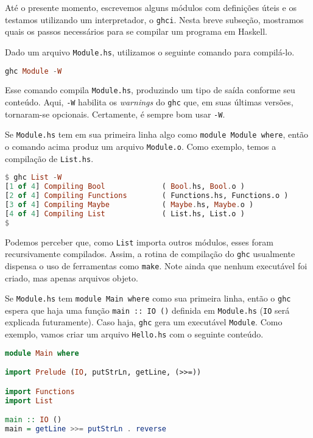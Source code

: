 \documentclass[a4paper]{article}
\begin{document}
Até o presente momento, escrevemos alguns módulos com definições úteis e os testamos utilizando um interpretador, o \texttt{ghci}.
Nesta breve subseção, mostramos quais os passos necessários para se compilar um programa em Haskell.

Dado um arquivo \texttt{Module.hs}, utilizamos o seguinte comando para compilá-lo.

\begin{lstlisting}[language=haskell, frame=single]
ghc Module -W
\end{lstlisting}

Esse comando compila \texttt{Module.hs}, produzindo um tipo de saída conforme seu conteúdo.
Aqui, \texttt{-W} habilita os \emph{warnings} do \texttt{ghc} que, em suas últimas versões, tornaram-se opcionais.
Certamente, é sempre bom usar \texttt{-W}.

Se \texttt{Module.hs} tem em sua primeira linha algo como \texttt{module Module where}, então o comando acima produz um arquivo \texttt{Module.o}.
Como exemplo, temos a compilação de \texttt{List.hs}.

\begin{lstlisting}[language=haskell, frame=single]
$ ghc List -W
[1 of 4] Compiling Bool             ( Bool.hs, Bool.o )
[2 of 4] Compiling Functions        ( Functions.hs, Functions.o )
[3 of 4] Compiling Maybe            ( Maybe.hs, Maybe.o )
[4 of 4] Compiling List             ( List.hs, List.o )
$
\end{lstlisting}

Podemos perceber que, como \texttt{List} importa outros módulos, esses foram recursivamente compilados.
Assim, a rotina de compilação do \texttt{ghc} usualmente dispensa o uso de ferramentas como \texttt{make}.
Note ainda que nenhum executável foi criado, mas apenas arquivos objeto.

Se \texttt{Module.hs} tem \texttt{module Main where} como sua primeira linha, então o \texttt{ghc} espera que haja uma função \texttt{main :: IO ()} definida em \texttt{Module.hs} (\texttt{IO} será explicada futuramente).
Caso haja, \texttt{ghc} gera um executável \texttt{Module}.
Como exemplo, vamos criar um arquivo \texttt{Hello.hs} com o seguinte conteúdo.

\begin{lstlisting}[language=haskell, frame=single]
module Main where

import Prelude (IO, putStrLn, getLine, (>>=))

import Functions
import List

main :: IO ()
main = getLine >>= putStrLn . reverse
\end{lstlisting}
\end{document}
